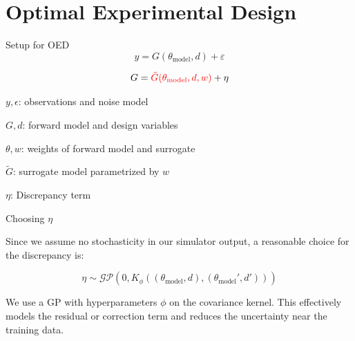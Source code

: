\documentclass[usenames,dvipsnames,aspectratio=169]{beamer}
\theoremstyle{definition}
\begin{document}
\section[OED]{Optimal Experimental Design}
\begin{frame}{Setup for OED}
    \begin{equation}
        y = G(\theta_{\textrm{model}}, d) + \varepsilon
        \label{eq: general_obs_model} \nonumber
    \end{equation}
    
    \begin{equation}
        G = \textcolor{red}{\tilde{G}(\theta_{\textrm{model}}, d, w)} + \eta \nonumber
        \label{eq: general_surr_model}
    \end{equation}

$y, \epsilon$: observations and noise model

$G, d$: forward model and design variables

$\theta, w$: weights of forward model and surrogate

$\tilde{G}$: surrogate model parametrized by $w$

$\eta$: Discrepancy term
\end{frame}

\begin{frame}{Choosing $\eta$}

Since we assume no stochasticity in our simulator output, a reasonable choice for the discrepancy is:

\begin{equation}
    \eta \sim \mathcal{G}\mathcal{P}(0, K_\phi((\theta_{\textrm{model}}, d), (\theta_{\textrm{model}}', d'))) \nonumber
\end{equation}

We use a GP with hyperparameters $\phi$ on the covariance kernel. This effectively models the residual or correction term and reduces the uncertainty near the training data.
    
\end{frame}
\end{document}
